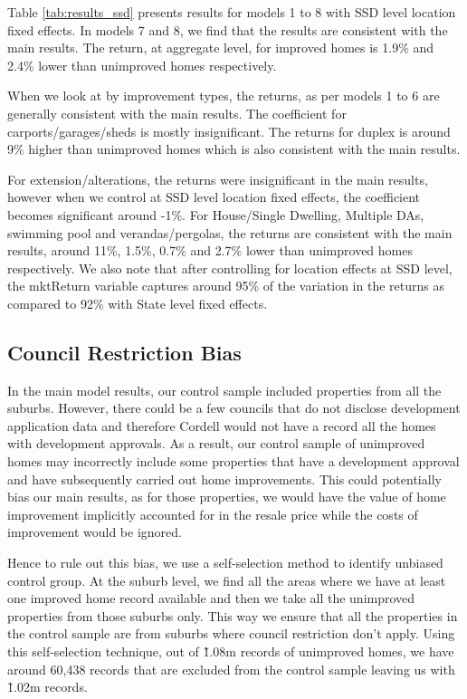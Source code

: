 \documentclass{article}
\begin{document}
Table \ref{tab:results_ssd} presents results for models 1 to 8 with SSD level location fixed effects. In models 7 and 8, we find that the results are consistent with the main results. The return, at aggregate level, for improved homes is 1.9\% and 2.4\% lower than unimproved homes respectively. 


\restoregeometry 

When we look at by improvement types, the returns, as per models 1 to 6 are generally consistent with the main results. The coefficient for carports/garages/sheds is mostly insignificant. The returns for duplex is around 9\% higher than unimproved homes which is also consistent with the main results.

For extension/alterations, the returns were insignificant in the main results, however when we control at SSD level location fixed effects, the coefficient becomes significant around -1\%. For House/Single Dwelling, Multiple DAs, swimming pool and verandas/pergolas, the returns are consistent with the main results, around 11\%, 1.5\%, 0.7\% and 2.7\% lower than unimproved homes respectively. We also note that after controlling for location effects at SSD level, the mktReturn variable captures around 95\% of the variation in the returns as compared to 92\% with State level fixed effects.

\subsection{Council Restriction Bias}

In the main model results, our control sample included properties from all the suburbs. However, there could be a few councils that do not disclose development application data and therefore Cordell would not have a record all the homes with development approvals. As a result, our control sample of unimproved homes may incorrectly include some properties that have a development approval and have subsequently carried out home improvements. This could potentially bias our main results, as for those properties, we would have the value of home improvement implicitly accounted for in the resale price while the costs of improvement would be ignored. 

Hence to rule out this bias, we use a self-selection method to identify unbiased control group. At the suburb level, we find all the areas where we have at least one improved home record available and then we take all the unimproved properties from those suburbs only. This way we ensure that all the properties in the control sample are from suburbs where council restriction don't apply. Using this self-selection technique, out of \~1.08m records of unimproved homes, we have around 60,438 records that are excluded from the control sample leaving us with \~1.02m records. 
\end{document}
